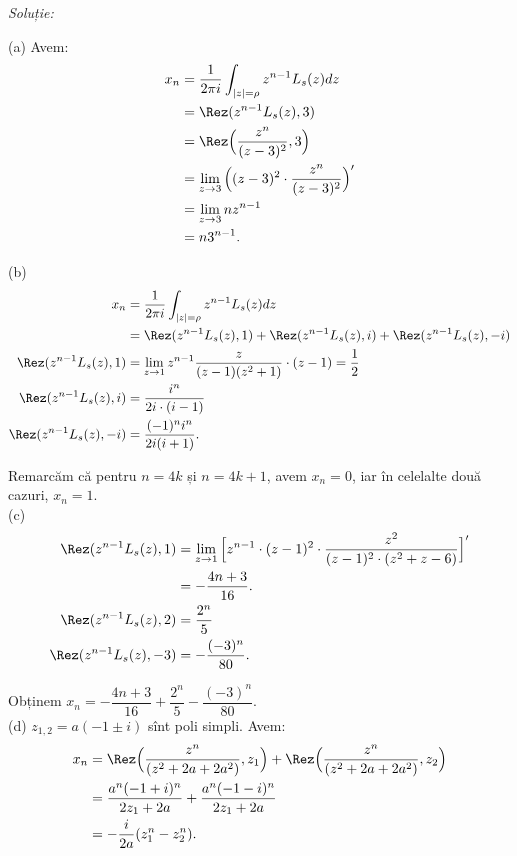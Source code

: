 \emph{Soluție:}

(a) Avem:
\begin{align*}
    x_n &= \dfrac{1}{2\pi i} \int_{|z| = \rho} z^{n-1} L_s (z) dz \\
        &= \Rez(z^{n-1} L_s(z), 3) \\
        &= \Rez \Big( \dfrac{z^n}{(z-3)^2}, 3 \Big) \\
        &= \lim_{z \to 3} \Big( (z-3)^2 \cdot \dfrac{z^n}{(z-3)^2} \Big)^{\prime} \\
        &= \lim_{z \to 3} nz^{n-1} \\
        &= n3^{n-1}.
\end{align*}

(b)
\begin{align*}
    x_n &= \dfrac{1}{2 \pi i} \int_{|z| = \rho} z^{n-1} L_s(z) dz \\
        &= \Rez(z^{n-1} L_s (z), 1) + \Rez(z^{n-1} L_s(z), i) + 
        \Rez(z^{n-1} L_s(z), -i) \\
    \Rez(z^{n-1}L_s(z),1) &= \lim_{z \to 1} z^{n-1} \dfrac{z}{(z - 1)(z^2 + 1)} 
    \cdot (z-1) = \dfrac{1}{2} \\
    \Rez(z^{n-1} L_s(z), i) &= \dfrac{i^n}{2i \cdot (i-1)} \\
    \Rez(z^{n-1} L_s(z), -i) &= \dfrac{(-1)^n i^n}{2i(i+1)}.
\end{align*}

Remarcăm că pentru $n = 4k$ și $n = 4k+1$, avem $x_n = 0$, iar în celelalte 
două cazuri, $x_n = 1$. \\

(c)
\begin{align*}
    \Rez(z^{n-1} L_s(z), 1) &= \lim_{z\to 1} \Big[ z^{n-1} \cdot (z-1)^2 \cdot %
    \dfrac{z^2}{(z-1)^2 \cdot (z^2 + z - 6)} \Big]^{\prime}\\
                            &= - \dfrac{4n + 3}{16}. \\
    \Rez(z^{n-1} L_s(z), 2) &= \dfrac{2^n}{5} \\
    \Rez(z^{n-1} L_s(z), -3) &= -\dfrac{(-3)^n}{80}.
\end{align*}

Obținem $x_n = - \dfrac{4n+3}{16} + \dfrac{2^n}{5} - \dfrac{(-3)^n}{80}$. \\

(d) $z_{1,2} = a (-1 \pm i)$ sînt poli simpli. Avem:
\begin{align*}
    x_n &= \Rez\Big( \dfrac{z^n}{(z^2 + 2a + 2a^2)}, z_1 \Big) + 
    \Rez\Big(  \dfrac{z^n}{(z^2 + 2a + 2a^2)}, z_2 \Big) \\
        &= \dfrac{a^n(-1 + i)^n}{2z_1 + 2a} + \dfrac{a^n(-1-i)^n}{2z_1 + 2a} \\
        &= -\dfrac{i}{2a}(z_1^n - z_2^n).
\end{align*}

